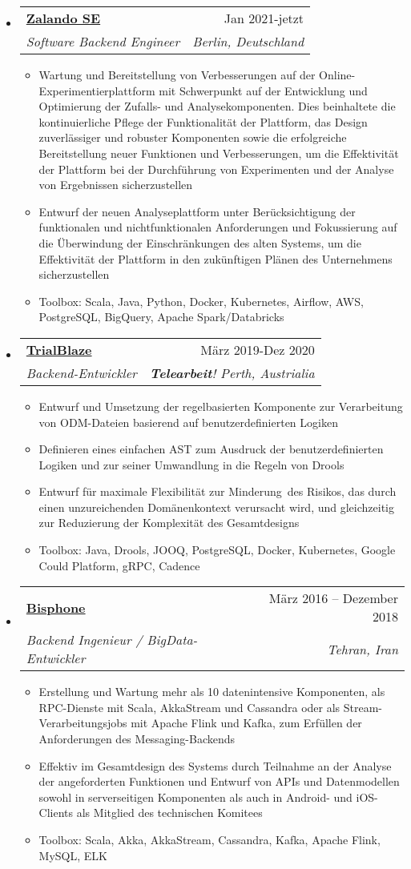 \documentclass[letterpaper,12pt]{article}[leftmargin=*]
\makeatletter
\def \entryspacing {-0pt}
\newcommand{\resumeEntryStart}{\begin{itemize}[leftmargin=2.5mm]}
\newcommand{\resumeEntryEnd}{\end{itemize}\vspace{\entryspacing}}
\newcommand{\resumeItemListStart}{\begin{itemize}[leftmargin=4.5mm]}
\newcommand{\resumeItemListEnd}{\end{itemize}}
\newcommand{\resumeItem}[1]{
  \item\small{
    {#1 \vspace{-2pt}}
  }
}
\newcommand{\resumeEntryTSDL}[4]{
  \vspace{-1pt}\item[]
    \begin{tabular*}{0.97\textwidth}{l@{\extracolsep{\fill}}r}
      \textbf{\color{primary}#1} & {\firabook\color{accent}\small#2} \\
      \textit{\color{accent}\small#3} & \textit{\color{accent}\small#4} \\
    \end{tabular*}\vspace{-6pt}
}
\makeatother
\begin{document}
  \resumeEntryStart
    \resumeEntryTSDL
      {\href{https://zalando.de}{Zalando SE}}{Jan 2021-jetzt}
      {Software Backend Engineer}{Berlin, Deutschland}
    \resumeItemListStart
      \resumeItem{Wartung und Bereitstellung von Verbesserungen auf der Online-Experimentierplattform mit Schwerpunkt auf der
      Entwicklung und Optimierung der Zufalls- und Analysekomponenten. Dies beinhaltete die kontinuierliche Pflege der
      Funktionalität der Plattform, das Design zuverlässiger und robuster Komponenten sowie die erfolgreiche Bereitstellung
      neuer Funktionen und Verbesserungen, um die Effektivität der Plattform bei der Durchführung von Experimenten und der
      Analyse von Ergebnissen sicherzustellen}
      \resumeItem{Entwurf der neuen Analyseplattform unter Berücksichtigung der funktionalen und nichtfunktionalen Anforderungen
      und Fokussierung auf die Überwindung der Einschränkungen des alten Systems, um die Effektivität der Plattform in den zukünftigen
      Plänen des Unternehmens sicherzustellen}
      \resumeItem{Toolbox: Scala, Java, Python, Docker, Kubernetes, Airflow, AWS, PostgreSQL, BigQuery, Apache Spark/Databricks}
    \resumeItemListEnd
  \resumeEntryEnd

  \resumeEntryStart
    \resumeEntryTSDL
      {\href{https://trialblaze.com}{TrialBlaze}}{März 2019-Dez 2020}
      {Backend-Entwickler}{\textbf{Telearbeit}! Perth, Austrialia}
    \resumeItemListStart
      \resumeItem {Entwurf und Umsetzung der regelbasierten Komponente zur Verarbeitung von ODM-Dateien basierend auf benutzerdefinierten Logiken}
      \resumeItem{Definieren eines einfachen AST zum Ausdruck der benutzerdefinierten Logiken und zur seiner Umwandlung in die Regeln von Drools}
      \resumeItem{Entwurf für maximale Flexibilität zur Minderung des Risikos, das durch einen unzureichenden Domänenkontext verursacht wird, und gleichzeitig zur Reduzierung der Komplexität des Gesamtdesigns}
      \resumeItem{Toolbox: Java, Drools, JOOQ, PostgreSQL, Docker, Kubernetes, Google Could Platform, gRPC, Cadence}
    \resumeItemListEnd
  \resumeEntryEnd


  \resumeEntryStart
    \resumeEntryTSDL
      {\href{http://bisphone.com}{Bisphone}}{März 2016 – Dezember 2018}
      {Backend Ingenieur / BigData-Entwickler}{Tehran, Iran}
    \resumeItemListStart
      \resumeItem{Erstellung und Wartung mehr als 10 datenintensive Komponenten, als RPC-Dienste mit Scala, AkkaStream und Cassandra oder als Stream-Verarbeitungsjobs mit Apache Flink und Kafka, zum Erfüllen der Anforderungen des Messaging-Backends 
}
      \resumeItem{Effektiv im Gesamtdesign des Systems durch Teilnahme an der Analyse der angeforderten Funktionen und Entwurf von APIs und Datenmodellen sowohl in serverseitigen Komponenten als auch in Android- und iOS-Clients als Mitglied des technischen Komitees}
      \resumeItem{Toolbox: Scala, Akka, AkkaStream, Cassandra, Kafka, Apache Flink, MySQL, ELK}
    \resumeItemListEnd
  \resumeEntryEnd
\end{document}
